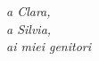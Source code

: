 \thispagestyle{empty}
\null{}
\begin{flushright}
\emph{{a Clara,\\a Silvia,\\ai miei genitori}}
\end{flushright}
\null
\newpage